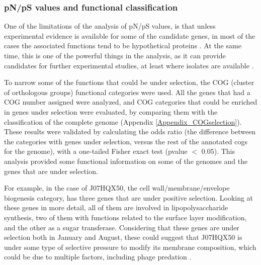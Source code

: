 \subsubsection{pN/pS values and functional classification}

One of the limitations of the analysis of pN/pS values, is that unless experimental evidence is available for some of the candidate genes, in most of the cases the associated functions tend to be hypothetical proteins \cite{Tai:2011jo}. At the same time, this is one of the powerful things in the analysis, as it can provide candidates for further experimental studies, at least where isolates are available \cite{Fricke:2011gy}.

To narrow some of the functions that could be under selection, the COG (cluster of orthologous groups) functional categories were used. All the genes that had a COG number assigned were analyzed, and COG categories that could be enriched in genes under selection were evaluated, by comparing them with the classification of the complete genome (Appendix \ref{Appendix_COGselection}). These results were validated by calculating the odds ratio (the difference between the categories with genes under selection, versus the rest of the annotated cogs for the genome), with a one-tailed Fisher exact test (pvalue $<$ 0.05). This analysis provided some functional information on some of the genomes and the genes that are under selection. 

For example, in the case of J07HQX50, the cell wall/membrane/envelope biogenesis category, has three genes that are under positive selection. Looking at these genes in more detail, all of them are involved in lipopolysaccharide synthesis, two of them with functions related to the surface layer modification, and the other as a sugar transferase. Considering that these genes are under selection both in January and August, these could suggest that J07HQX50 is under some type of selective pressure to modify its membrane composition, which could be due to multiple factors, including phage predation \cite{RodriguezValera:2009cr}.

